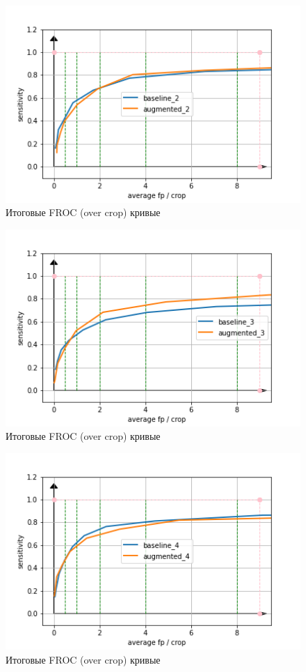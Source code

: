 \begin{figure}[!h]
\includegraphics[width=\linewidth]{images/froc-results/cv_plot_2.png}
\caption{Итоговые FROC (over crop) кривые}\label{image:final-results-2}
\centering
\end{figure}

\begin{figure}[!h]
\includegraphics[width=\linewidth]{images/froc-results/cv_plot_3.png}
\caption{Итоговые FROC (over crop) кривые}\label{image:final-results-3}
\centering
\end{figure}

\begin{figure}[!h]
\includegraphics[width=\linewidth]{images/froc-results/cv_plot_4.png}
\caption{Итоговые FROC (over crop) кривые}\label{image:final-results-4}
\centering
\end{figure}